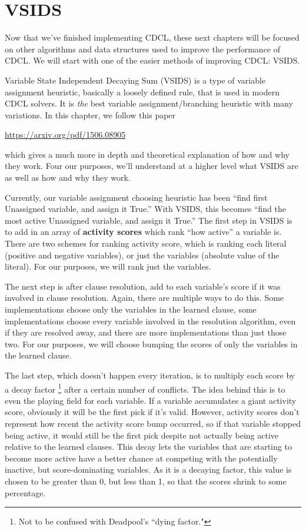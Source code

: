 \chapter{VSIDS}

Now that we've finished implementing CDCL, these next chapters will be focused 
on other algorithms and data structures used to improve the performance of CDCL.
We will start with one of the easier methods of improving CDCL: VSIDS.

Variable State Independent Decaying Sum (VSIDS) is a type of variable assignment 
heuristic, basically a loosely defined rule, that is used in modern CDCL solvers.
It is \textit{the} best variable assignment/branching heuristic with many variations.
In this chapter, we follow this paper
\begin{center}
    \url{https://arxiv.org/pdf/1506.08905}
\end{center}
which gives a much more in depth and theoretical explanation of how and why they work.
Four our purposes, we'll understand at a higher level what VSIDS are as well as how 
and why they work. 

Currently, our variable assignment choosing heuristic has been ``find first Unassigned
variable, and assign it True.'' With VSIDS, this becomes ``find the most active Unassigned
variable, and assign it True.'' The first step in VSIDS is to add in an array of
\textbf{activity scores} which rank ``how active'' a variable is. There are two schemes 
for ranking activity score, which is ranking each literal (positive and negative variables),
or just the variables (absolute value of the literal). For our purposes, we will rank just 
the variables. 

The next step is after clause resolution, add to each variable's score if it was involved 
in clause resolution. Again, there are multiple ways to do this. Some implementations choose 
only the variables in the learned clause, some implementations choose every variable involved 
in the resolution algorithm, even if they are resolved away, and there are more implementations 
than just those two. For our purposes, we will choose bumping the scores of only the variables 
in the learned clause.

The last step, which doesn't happen every iteration, is to multiply each score by a decay factor 
\footnote{Not to be confused with Deadpool's ``dying factor."}
after a certain number of conflicts. The idea behind this is to even the playing field for 
each variable. If a variable accumulates a giant activity score, obviously it will be the first 
pick if it's valid. However, activity scores don't represent how recent the activity score bump 
occurred, so if that variable stopped being active, it would still be the first pick despite 
not actually being active relative to the learned clauses. This decay lets the variables that 
are starting to become more active have a better chance at competing with the potentially 
inactive, but score-dominating variables. As it is a decaying factor, this value is chosen 
to be greater than 0, but less than 1, so that the scores shrink to some percentage.

